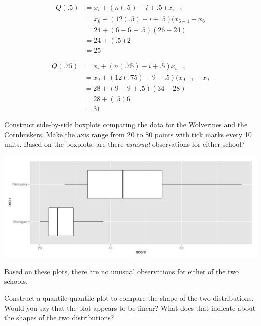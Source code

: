 \documentclass[11pt]{article}\usepackage[]{graphicx}\usepackage[]{color}
\makeatletter
\def\maxwidth{ %
  \ifdim\Gin@nat@width>\linewidth
    \linewidth
  \else
    \Gin@nat@width
  \fi
}
\newenvironment{knitrout}{}{} %
\makeatother
\begin{document}
   \begin{align*}
      Q(.5) &= x_i + (n (.5) - i + .5) x_{i + 1}  \tag{since $n p + 0.5 = 6.50 $} \\
             &= x_6 + (12 (.5) - i + .5) (x_{6 + 1} - x_6  \tag{since $p = 0.5$} \\
             &= 24 + (6 - 6 + .5) (26  - 24) \\
             &= 24 + (.5)2 \\
             &= 25
   \end{align*}

   \begin{align*}
      Q(.75) &= x_i + (n (.75) - i + .5) x_{i + 1}  \tag{since $n p + 0.5 = 9.50 $} \\
             &= x_9 + (12 (.75) - 9 + .5) (x_{9 + 1} - x_9  \tag{since $p = 0.75$} \\
             &= 28 + (9 - 9 + .5) (34  - 28) \\
             &= 28 + (.5)6 \\
             &= 31 
   \end{align*}

\item Construct side-by-side boxplots comparing the data for the Wolverines and the Cornhuskers. 
   Make the axis range from 20 to 80 points with tick marks every 10 units. 
   Based on the boxplots, are there \emph{unusual} observations for either school?

\begin{knitrout}
\color{fgcolor}
\includegraphics[width=.8\maxwidth]{figure/unnamed-chunk-1-1} 

\end{knitrout}

Based on these plots, there are no unusual observations for either of the two schools.
   
\item Construct a quantile-quantile plot to compare the shape of the two distributions. 
   Would you say that the plot appears to be linear? What does that indicate about the shapes of the two distributions? 
   
\end{document}
